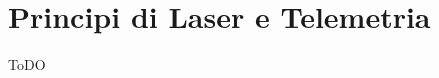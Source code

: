 \chapter{Principi di Laser e Telemetria}
\label{capitolo1}
\thispagestyle{empty}

\noindent ToDO\cite{foo}
